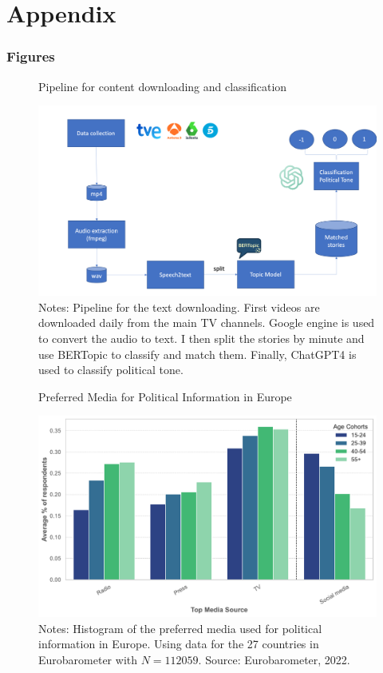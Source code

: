 \documentclass[12pt]{article}
\begin{document}
\part{Appendix} %

\parttoc %


\renewcommand\thefigure{\thesection.\arabic{figure}}   

\clearpage

\section{Figures}
	
	
	

	
	\begin{figure}[!htb]
		\centering
		\caption{Pipeline for content downloading and classification }
		\includegraphics[width=150mm]{figures/pipeline3}
		\caption*{\small Notes: Pipeline for the text downloading. First videos are downloaded daily from the main TV channels. Google engine is used to convert the audio to text. I then split the stories by minute and use BERTopic to classify and match them. Finally, ChatGPT4 is used to classify political tone.}
		\label{fig:pipeline}
	\end{figure}
	
	
	
	
	\begin{figure}[!htb]
		\centering
		\caption{Preferred Media for Political Information in Europe}
		\includegraphics[width=120mm]{figures/age_cohorts_full}
		\caption*{\small Notes: Histogram of the preferred media used for political information in Europe. Using data for the 27 countries in Eurobarometer with $N=112059.$ 
			Source: Eurobarometer, 2022. }
		\label{fig:motivation2}
	\end{figure}
	
\end{document}
